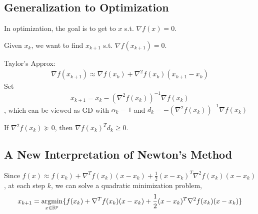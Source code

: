 \documentclass[11pt,a4paper]{article}
\newcommand{\argmin}{\operatornamewithlimits{argmin}}
\begin{document}
\subsection{Generalization to Optimization}
In optimization, the goal is to get to $x$ s.t. $\nabla f(x)=0$.

Given $x_k$, we want to find $x_{k+1}$ s.t. $\nabla f(x_{k+1})=0$.

Taylor's Approx: \begin{equation}
    \begin{aligned}
        \nabla f(x_{k+1})\approx \nabla f(x_k)+\nabla^2 f(x_k)(x_{k+1}-x_k)
    \end{aligned}
    \nonumber
\end{equation}
Set $$x_{k+1}=x_k-(\nabla^2 f(x_k))^{-1}\nabla f(x_k)$$, which can be viewed as GD with $\alpha_k=1$ and $d_k=-(\nabla^2 f(x_k))^{-1}\nabla f(x_k)$

If $\nabla^2 f(x_k)\succeq 0$, then $\nabla f(x_k)^Td_k\geq 0$.

\subsection{A New Interpretation of Newton’s Method}
Since $f(x)\approx f(x_k)+\nabla^T f(x_k)(x-x_k)+\frac{1}{2}(x-x_k)^T \nabla^2 f(x_k) (x-x_k)$, at each step $k$, we can solve a quadratic minimization problem,
\begin{equation}
    \begin{aligned}
        x_{k+1}=\argmin_{x\in \mathbb{R}^p}\{f(x_k)+\nabla^T f(x_k)(x-x_k)+\frac{1}{2}(x-x_k)^T \nabla^2 f(x_k) (x-x_k)\}
    \end{aligned}
    \nonumber
\end{equation}
\end{document}
